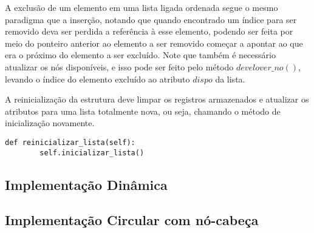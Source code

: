 \documentclass[a4paper, twocolumn]{article}
\theoremstyle{definition}
\begin{document}
A exclusão de um elemento em uma lista ligada ordenada segue o mesmo paradigma que a inserção, notando que quando encontrado um índice para ser removido deva ser perdida a referência à esse elemento, podendo ser feita por meio do ponteiro anterior ao elemento a ser removido começar a apontar ao que era o próximo do elemento a ser excluído. Note que também é necessário atualizar os nós disponíveis, e isso pode ser feito pelo método $develover\_no()$, levando o índice do elemento excluído ao atributo $dispo$ da lista.

A reinicialização da estrutura deve limpar os registros armazenados e atualizar os atributos para uma lista totalmente nova, ou seja, chamando o método de inicialização novamente.

\begin{lstlisting}[label=lista_ligada_estat_reiniciar,caption= Lista Ligada estática ordenada (reinicialização)]
def reinicializar_lista(self):
        self.inicializar_lista()
\end{lstlisting}

\subsection{Implementação Dinâmica}



\subsection{Implementação Circular com nó-cabeça}
\end{document}
